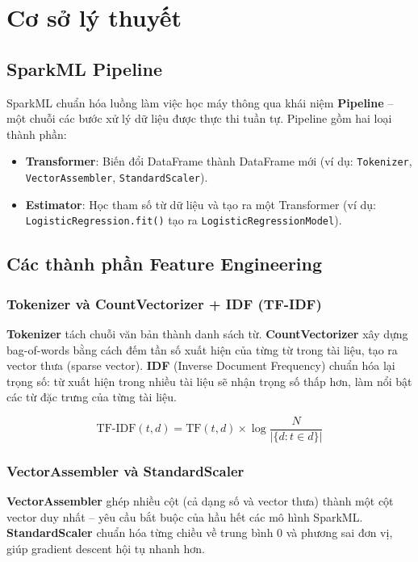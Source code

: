 \section{Cơ sở lý thuyết}

\subsection{SparkML Pipeline}

SparkML chuẩn hóa luồng làm việc học máy thông qua khái niệm \textbf{Pipeline} -- một chuỗi các bước xử lý dữ liệu được thực thi tuần tự. Pipeline gồm hai loại thành phần:

\begin{itemize}
    \item \textbf{Transformer}: Biến đổi DataFrame thành DataFrame mới (ví dụ: \texttt{Tokenizer}, \texttt{VectorAssembler}, \texttt{StandardScaler}).
    \item \textbf{Estimator}: Học tham số từ dữ liệu và tạo ra một Transformer (ví dụ: \texttt{LogisticRegression.fit()} tạo ra \texttt{LogisticRegressionModel}).
\end{itemize}

\subsection{Các thành phần Feature Engineering}

\subsubsection{Tokenizer và CountVectorizer + IDF (TF-IDF)}

\textbf{Tokenizer} tách chuỗi văn bản thành danh sách từ. \textbf{CountVectorizer} xây dựng bag-of-words bằng cách đếm tần số xuất hiện của từng từ trong tài liệu, tạo ra vector thưa (sparse vector). \textbf{IDF} (Inverse Document Frequency) chuẩn hóa lại trọng số: từ xuất hiện trong nhiều tài liệu sẽ nhận trọng số thấp hơn, làm nổi bật các từ đặc trưng của từng tài liệu.

$$\text{TF-IDF}(t, d) = \text{TF}(t,d) \times \log\frac{N}{|\{d : t \in d\}|}$$

\subsubsection{VectorAssembler và StandardScaler}

\textbf{VectorAssembler} ghép nhiều cột (cả dạng số và vector thưa) thành một cột vector duy nhất -- yêu cầu bắt buộc của hầu hết các mô hình SparkML. \textbf{StandardScaler} chuẩn hóa từng chiều về trung bình 0 và phương sai đơn vị, giúp gradient descent hội tụ nhanh hơn.

